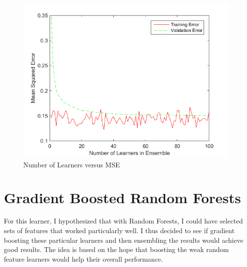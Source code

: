 \documentclass[twoside,11pt]{article}
\theoremstyle{definition}
\begin{document}
\begin{figure}[h!]
\centering
\includegraphics[width=4 in]{numLearnersVersusMSE.png}
\caption{Number of Learners versus MSE}
\end{figure}

\section*{Gradient Boosted Random Forests}

For this learner, I hypothesized that with Random Forests, I could have selected sets of features that worked particularly well. I thus decided to see if gradient boosting these particular learners and then ensembling the results would achieve good results. The idea is based on the hope that boosting the weak random feature learners would help their overall performance. 
\end{document}
